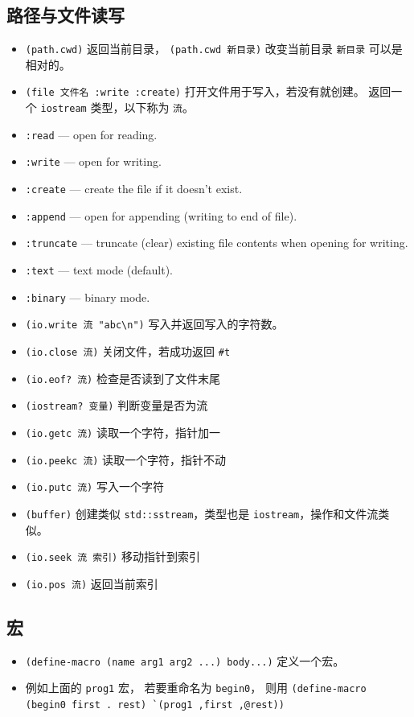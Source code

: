 \subsection{路径与文件读写}
\begin{itemize}
\item \verb`(path.cwd)` 返回当前目录， \verb`(path.cwd 新目录)` 改变当前目录 \verb`新目录` 可以是相对的。
\item \verb`(file 文件名 :write :create)` 打开文件用于写入，若没有就创建。 返回一个 \verb`iostream` 类型，以下称为 \verb`流`。
\item \verb`:read` — open for reading.
\item \verb`:write` — open for writing.
\item \verb`:create` — create the file if it doesn’t exist.
\item \verb`:append` — open for appending (writing to end of file).
\item \verb`:truncate` — truncate (clear) existing file contents when opening for writing.
\item \verb`:text` — text mode (default).
\item \verb`:binary` — binary mode.
\item \verb`(io.write 流 "abc\n")` 写入并返回写入的字符数。
\item \verb`(io.close 流)` 关闭文件，若成功返回 \verb`#t`
\item \verb`(io.eof? 流)` 检查是否读到了文件末尾
\item \verb`(iostream? 变量)` 判断变量是否为流
\item \verb`(io.getc 流)` 读取一个字符，指针加一
\item \verb`(io.peekc 流)` 读取一个字符，指针不动
\item \verb`(io.putc 流)` 写入一个字符
\item \verb`(buffer)` 创建类似 \verb`std::sstream`，类型也是 \verb`iostream`，操作和文件流类似。
\item \verb`(io.seek 流 索引)` 移动指针到索引
\item \verb`(io.pos 流)` 返回当前索引
\end{itemize}


\subsection{宏}
\begin{itemize}
\item \verb`(define-macro (name arg1 arg2 ...) body...)` 定义一个宏。
\item 例如上面的 \verb`prog1` 宏， 若要重命名为 \verb`begin0`， 则用 \verb|(define-macro (begin0 first . rest) `(prog1 ,first ,@rest))|
\end{itemize}

